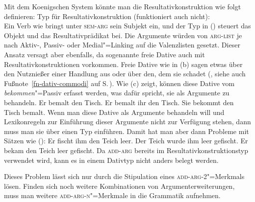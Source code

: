 Mit dem Koenigschen System könnte man die Resultativkonstruktion wie folgt definieren:
\eas
Typ für Resultativkonstruktion (funktioniert auch nicht):\\
\zs
Ein Verb wie  bringt unter \textsc{sem-arg} sein Subjekt ein, und der
Typ in () steuert das Objekt und das Resultativprädikat bei. Die Argumente
würden von \textsc{arg-list} je nach Aktiv-, Passiv- oder Medial"=Linking
auf die Valenzlisten gesetzt. Dieser Ansatz versagt aber ebenfalls, da sogenannte freie
Dative auch mit Resultativkonstruktionen vorkommen. Freie
Dative wie in
(b) sagen etwas über den Nutznießer einer Handlung aus oder über den, dem sie schadet
(\citealt[]{Wegener85b}, siehe auch Fußnote~\ref{fn-dativ-commodi} auf S.\,\pageref{fn-dativ-commodi}).
Wie (c) zeigt, können diese Dative vom \emph{bekommen}"=Passiv
erfasst werden, was dafür spricht, sie als Argumente zu behandeln.
\eal
\ex Er bemalt den Tisch.
\ex Er bemalt ihr den Tisch.
\ex Sie bekommt den Tisch bemalt.
\zl
Wenn man diese Dative als Argumente behandeln will und Lexikonregeln zur Einführung
dieser Argumente nicht zur Verfügung stehen, dann muss man sie über einen Typ einführen.
Damit hat man aber dann Probleme mit Sätzen wie ():
\eal
\ex Er fischt ihm den Teich leer.
\ex Der Teich wurde ihm leer gefischt.
\ex Er bekam den Teich leer gefischt.
\zl
Da \textsc{add-arg} bereits im Resultativkonstruktionstyp verwendet wird, kann es in einem
Dativtyp nicht anders belegt werden.

Dieses Problem lässt sich nur durch die Stipulation eines \textsc{add-arg-2}"=Merkmals lösen. Finden
sich noch weitere Kombinationen von Argumenterweiterungen, muss man weitere \textsc{add-arg-n}"=Merkmale
in die Grammatik aufnehmen.

